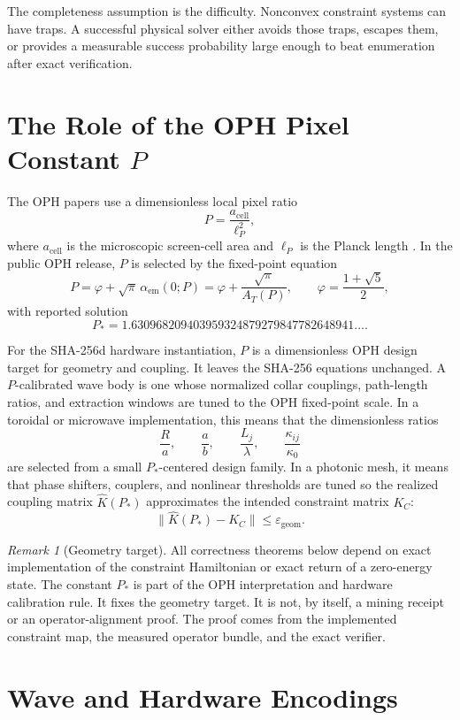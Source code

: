 \documentclass[11pt]{article}
\theoremstyle{definition}
\theoremstyle{remark}
\newtheorem{remark}[theorem]{Remark}
\begin{document}
The completeness assumption is the difficulty. Nonconvex constraint systems can
have traps. A successful physical solver either avoids those traps, escapes
them, or provides a measurable success probability large enough to beat
enumeration after exact verification.

\section{The Role of the OPH Pixel Constant \texorpdfstring{\(P\)}{P}}

The OPH papers use a dimensionless local pixel ratio
\[
P=\frac{a_{\mathrm{cell}}}{\ell_P^2},
\]
where \(a_{\mathrm{cell}}\) is the microscopic screen-cell area and \(\ell_P\)
is the Planck length \cite{OPHCompactCurrent,OPHScreenCurrent}. In the public OPH
release, \(P\) is selected by the fixed-point equation
\[
P=\varphi+\sqrt{\pi}\,\alpha_{\mathrm{em}}(0;P)
=\varphi+\frac{\sqrt{\pi}}{A_T(P)},
\qquad
\varphi=\frac{1+\sqrt5}{2},
\]
with reported solution
\[
P_\ast=1.630968209403959324879279847782648941\ldots.
\]

For the SHA-256d hardware instantiation, \(P\) is a dimensionless OPH design
target for geometry and coupling. It leaves the SHA-256 equations unchanged.
A \(P\)-calibrated
wave body is one whose normalized collar couplings, path-length ratios, and
extraction windows are tuned to the OPH fixed-point scale. In a toroidal or
microwave implementation, this means that the
dimensionless ratios
\[
\frac{R}{a},\qquad
\frac{a}{b},\qquad
\frac{L_j}{\lambda},\qquad
\frac{\kappa_{ij}}{\kappa_0}
\]
are selected from a small \(P_\ast\)-centered design family. In a photonic mesh,
it means that phase shifters, couplers, and nonlinear thresholds are tuned so
the realized coupling matrix \(\widehat K(P_\ast)\) approximates the intended
constraint matrix \(K_C\):
\[
\|\widehat K(P_\ast)-K_C\|\le \varepsilon_{\mathrm{geom}}.
\]

\begin{remark}[Geometry target]
All correctness theorems below depend on exact implementation of the
constraint Hamiltonian or exact return of a zero-energy state. The constant
\(P_\ast\) is part of the OPH interpretation and hardware calibration rule.
It fixes the geometry target. It is not, by itself, a mining receipt or an
operator-alignment proof. The proof comes from the implemented constraint
map, the measured operator bundle, and the exact verifier.
\end{remark}

\section{Wave and Hardware Encodings}
\end{document}

